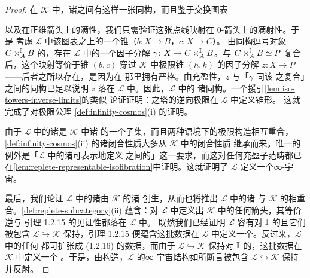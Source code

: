 \begin{proof}
在 $\mathcal{K}$ 中，诸\trFunctorSpace{}之间有这样一张同构，而且鉴于交换图表
\begin{center}
\end{center}
以及在正维箭头上的满性，我们只需验证这张点线映射在 0-箭头上的满射性。于是
考虑 $\mathcal{L}$ 中该\trPullback{}图表之上的一个锥（$b\colon X\to B$，$c\colon X\to C$）。
由同构逗号对象 $C\times^{\mathbb{I}}_{A}B$ 的\trUniversalProperty{}，存在 $\mathcal{L}$
中的一个因子分解 $\gamma\colon X\to C\times^{\mathbb{I}}_{A}B$。与\trEquivalence{}
$C\times^{\mathbb{I}}_{A}B\simeq P$ 复合后，这个映射等价于锥 $(b,c)$ 穿过 $\mathcal{K}$
中极限锥 $(h,k)$ 的因子分解 $z\colon X\to P$——后者之所以存在，是因为\trPullback{}在
那里拥有严格\trUniversalProperty{}。由充盈性，$z$ 与「$\gamma$ 同该\trEquivalence{}%
之复合」之间的同构已足以说明 $z$ 落在 $\mathcal{L}$ 中。因此，$\mathcal{L}$ 中的
诸\trFunctorSpace{}同构。一个援引\cref{lem:iso-towers-inverse-limits}的类似
论证证明：\trIsofibration{}之塔的逆向极限在 $\mathcal{L}$ 中定义锥形\trLimit{}。
这就完成了对极限公理 \cref{def:infinity-cosmos}(i) 的证明。

由于 $\mathcal{L}$ 中的诸\trIsofibration{}是 $\mathcal{K}$ 中诸%
\trIsofibration{}的一个子集，而且两种语境下的极限构造相互重合，
\cref{def:infinity-cosmos}(ii) 的诸闭合性质大多从 $\mathcal{K}$ 中的闭合性质
继承而来。唯一的例外是「$\mathcal{L}$ 中的诸\trIsofibration{}可表示地定义%
\trQuasiCategory{}之间的\trIsofibration」这一要求，而这对任何充盈子范畴都已
在\cref{lem:replete-representable-isofibration}中证明。这就证明了 $\mathcal{L}$
定义一个∞-宇宙。

最后，我们论证 $\mathcal{L}$ 中的诸\trEquivalence{}由 $\mathcal{K}$ 的诸%
\trEquivalence{}创生，从而也将推出 $\mathcal{L}$ 中的诸\trTrivialFibration{}%
与 $\mathcal{K}$ 的相重合。\cref{def:replete-subcategory}(ii) 蕴含：对
$\mathcal{L}$ 中定义出 $\mathcal{K}$ 中\trEquivalence{}的任何箭头，其等价逆与
引理 1.2.15 的见证性\trHomotopyCoherentIsomorphism{}都落在 $\mathcal{L}$ 中。
既然我们已经证明 $\mathcal{L}$ 容有对 $\mathbb{I}$ 的\trCotensor{}且它们被包含
$\mathcal{L}\hookrightarrow\mathcal{K}$ 保持，引理 1.2.15 便蕴含这批数据在
$\mathcal{L}$ 中定义一个\trEquivalence{}。反过来，$\mathcal{L}$ 中的任何%
\trEquivalence{}都可扩张成 (1.2.16) 的数据，而由于 $\mathcal{L}\hookrightarrow\mathcal{K}$
保持对 $\mathbb{I}$ 的\trCotensor{}，这批数据在 $\mathcal{K}$ 中定义一个%
\trEquivalence{}。于是，由构造，$\mathcal{L}$ 的∞-宇宙结构如所断言被包含
$\mathcal{L}\hookrightarrow\mathcal{K}$ 保持并反射。
\end{proof}

